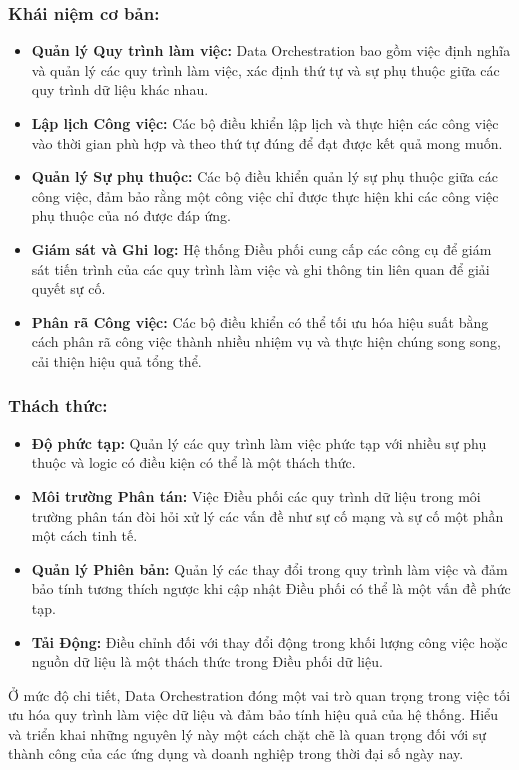 \subsubsection*{Khái niệm cơ bản:}

\begin{itemize}
    \item \textbf{Quản lý Quy trình làm việc:} Data Orchestration bao gồm việc định nghĩa và quản lý các quy trình làm việc, xác định thứ tự và sự phụ thuộc giữa các quy trình dữ liệu khác nhau.
    
    \item \textbf{Lập lịch Công việc:} Các bộ điều khiển lập lịch và thực hiện các công việc vào thời gian phù hợp và theo thứ tự đúng để đạt được kết quả mong muốn.
    
    \item \textbf{Quản lý Sự phụ thuộc:} Các bộ điều khiển quản lý sự phụ thuộc giữa các công việc, đảm bảo rằng một công việc chỉ được thực hiện khi các công việc phụ thuộc của nó được đáp ứng.
    
    \item \textbf{Giám sát và Ghi log:} Hệ thống Điều phối cung cấp các công cụ để giám sát tiến trình của các quy trình làm việc và ghi thông tin liên quan để giải quyết sự cố.
    
    \item \textbf{Phân rã Công việc:} Các bộ điều khiển có thể tối ưu hóa hiệu suất bằng cách phân rã công việc thành nhiều nhiệm vụ và thực hiện chúng song song, cải thiện hiệu quả tổng thể.
\end{itemize}

\subsubsection*{Thách thức:}

\begin{itemize}
    \item \textbf{Độ phức tạp:} Quản lý các quy trình làm việc phức tạp với nhiều sự phụ thuộc và logic có điều kiện có thể là một thách thức.
    
    \item \textbf{Môi trường Phân tán:} Việc Điều phối các quy trình dữ liệu trong môi trường phân tán đòi hỏi xử lý các vấn đề như sự cố mạng và sự cố một phần một cách tinh tế.
    
    \item \textbf{Quản lý Phiên bản:} Quản lý các thay đổi trong quy trình làm việc và đảm bảo tính tương thích ngược khi cập nhật Điều phối có thể là một vấn đề phức tạp.
    
    \item \textbf{Tải Động:} Điều chỉnh đối với thay đổi động trong khối lượng công việc hoặc nguồn dữ liệu là một thách thức trong Điều phối dữ liệu.
\end{itemize}

Ở mức độ chi tiết, Data Orchestration đóng một vai trò quan trọng trong việc tối ưu hóa quy trình làm việc dữ liệu và đảm bảo tính hiệu quả của hệ thống. Hiểu và triển khai những nguyên lý này một cách chặt chẽ là quan trọng đối với sự thành công của các ứng dụng và doanh nghiệp trong thời đại số ngày nay.

